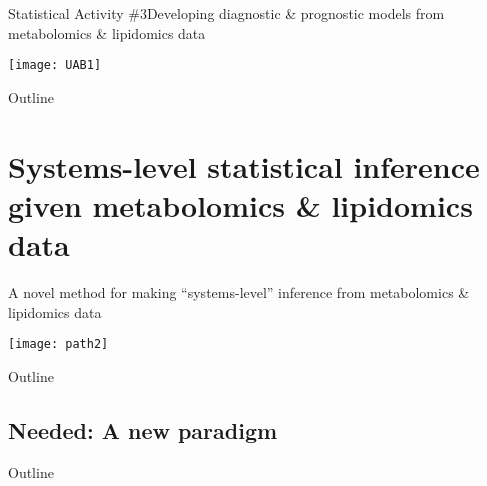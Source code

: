 \documentclass[xcolor=dvipsnames]{beamer}
\begin{document}
\begin{frame}{Statistical Activity \#3}{Developing diagnostic \& prognostic models from metabolomics \& lipidomics data}
\vspace{-15pt}
\begin{center}
\texttt{[image: UAB1]}
\end{center}
\end{frame}

\begin{frame}{Outline}
\vspace{-10.5pt}
\tableofcontents[subsectionstyle=hide]
\addtocounter{framenumber}{-1}
\end{frame}

\section{Systems-level statistical inference given metabolomics \& lipidomics data}

\begin{frame}{A novel method for making ``systems-level'' inference from metabolomics \& lipidomics data}
\vspace{-15pt}
\begin{center}
	\texttt{[image: path2]}
\end{center}
\end{frame}

\begin{frame}{Outline}
\vspace{-10.5pt}
\tableofcontents[currentsection,subsectionstyle=show/show/hide]
\addtocounter{framenumber}{-1}
\end{frame}

\subsection{Needed: A new paradigm}
\begin{frame}{Outline}
\vspace{-10.5pt}
\tableofcontents[currentsection,subsectionstyle=show/shaded/hide]
\addtocounter{framenumber}{-1}
\end{frame}
\end{document}
